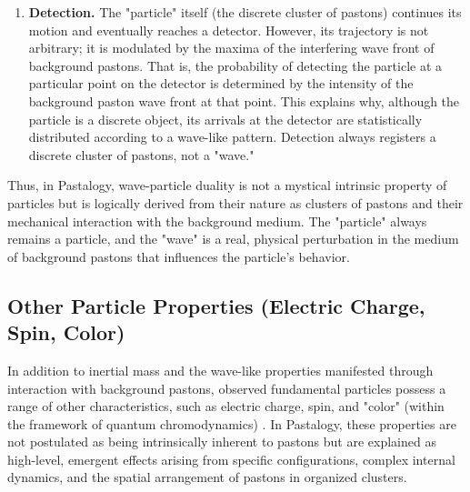 \documentclass[pdflatex,sn-mathphys-num,referee]{sn-jnl}
\begin{document}
\begin{enumerate}
    \item \textbf{Detection.} The "particle" itself (the discrete cluster of pastons) continues its motion and eventually reaches a detector. However, its trajectory is not arbitrary; it is modulated by the maxima of the interfering wave front of background pastons. That is, the probability of detecting the particle at a particular point on the detector is determined by the intensity of the background paston wave front at that point. This explains why, although the particle is a discrete object, its arrivals at the detector are statistically distributed according to a wave-like pattern. Detection always registers a discrete cluster of pastons, not a "wave."
\end{enumerate}

Thus, in Pastalogy, wave-particle duality is not a mystical intrinsic property of particles but is logically derived from their nature as clusters of pastons and their mechanical interaction with the background medium. The "particle" always remains a particle, and the "wave" is a real, physical perturbation in the medium of background pastons that influences the particle's behavior.

\subsection{Other Particle Properties (Electric Charge, Spin, Color)}\label{subsec:particle-properties}

In addition to inertial mass and the wave-like properties manifested through interaction with background pastons, observed fundamental particles possess a range of other characteristics, such as electric charge, spin, and "color" (within the framework of quantum chromodynamics) \cite{pdg2024}. In Pastalogy, these properties are not postulated as being intrinsically inherent to pastons but are explained as high-level, emergent effects arising from specific configurations, complex internal dynamics, and the spatial arrangement of pastons in organized clusters.
\end{document}
